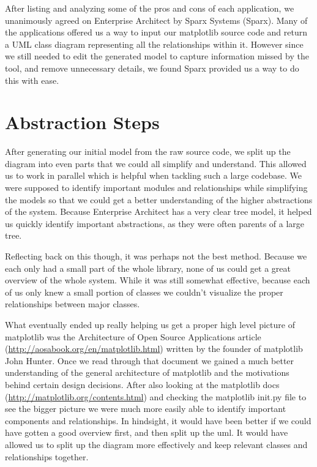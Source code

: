 \documentclass[pdftex,10pt,a4paper]{report}
\begin{document}
After listing and analyzing some of the pros and cons of each application, we unanimously agreed on Enterprise Architect by Sparx Systems (Sparx). Many of the applications offered us a way to input our matplotlib source code and return a UML class diagram representing all the relationships within it. However since we still needed to edit the generated model to capture information missed by the tool, and remove unnecessary details, we found Sparx provided us a way to do this with ease.


\section{Abstraction Steps}

After generating our initial model from the raw source code, we split up the diagram into even parts that we could all simplify and understand. This allowed us to work in parallel which is helpful when tackling such a large codebase. We were supposed to identify important modules and relationships while simplifying the models so that we could get a better understanding of the higher abstractions of the system. Because Enterprise Architect has a very clear tree model, it helped us quickly identify important abstractions, as they were often parents of a large tree.

Reflecting back on this though, it was perhaps not the best method. Because we each only had a small part of the whole library, none of us could get a great overview of the whole system. While it was still somewhat effective, because each of us only knew a small portion of classes we couldn't visualize the proper relationships between major classes. 

What eventually ended up really helping us get a proper high level picture of matplotlib was the Architecture of Open Source Applications article (\url{http://aosabook.org/en/matplotlib.html}) written by the founder of matplotlib John Hunter. Once we read through that document we gained a much better understanding of the general architecture of matplotlib and the motivations behind certain design decisions. After also looking at the matplotlib docs (\url{http://matplotlib.org/contents.html}) and checking the matplotlib init.py file to see the bigger picture we were much more easily able to identify important components and relationships. In hindsight, it would have been better if we could have gotten a good overview first, and then split up the uml. It would have allowed us to split up the diagram more effectively and keep relevant classes and relationships together.
\end{document}
